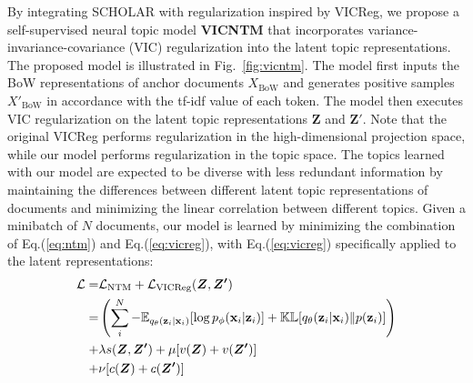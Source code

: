 \documentclass{article}
\begin{document}
By integrating SCHOLAR with regularization inspired by VICReg, we propose a self-supervised neural topic model \textbf{VICNTM} that incorporates variance-invariance-covariance (VIC) regularization into the latent topic representations.
The proposed model is illustrated in Fig.~\ref{fig:vicntm}. 
The model first inputs the BoW representations of anchor documents $X_{\text{BoW}}$ and generates positive samples $X'_{\text{BoW}}$ in accordance with the tf-idf value of each token.  
The model then executes VIC regularization on the latent topic representations $\boldsymbol{Z}$ and $\boldsymbol{Z'}$. 
Note that the original VICReg performs regularization in the high-dimensional projection space, while our model performs regularization in the topic space.
The topics learned with our model are expected to be diverse with less redundant information by maintaining the differences between different latent topic representations of documents and minimizing the linear correlation between different topics.
Given a minibatch of $N$ documents, our model is learned by minimizing the combination of Eq.(\ref{eq:ntm}) and Eq.(\ref{eq:vicreg}), with Eq.(\ref{eq:vicreg}) specifically applied to the latent representations:
\begin{eqnarray} \label{eq:vicntm}
    \mathcal{L} =& \mathcal{L}_{\text{NTM}} + \mathcal{L}_{\text{VICReg}}(\boldsymbol{Z},\boldsymbol{Z'}) \notag \\
    =& \left( \sum_{i}^{N}-\mathbb{E}_{q_{\theta}(\mathbf{z}_i|\mathbf{x}_i)}[\log p_{\phi}(\mathbf{x}_i|\mathbf{z}_i)]+\mathbb{KL}[q_\theta(\mathbf{z}_i|\mathbf{x}_i)\|p(\mathbf{z}_i)]\right) \notag \\
    +& \lambda s(\boldsymbol{Z},\boldsymbol{Z'}) +\mu [v(\boldsymbol{Z})+v(\boldsymbol{Z'})] \notag \\
    +& \nu [c(\boldsymbol{Z})+c(\boldsymbol{Z'})]
\end{eqnarray}
\end{document}
